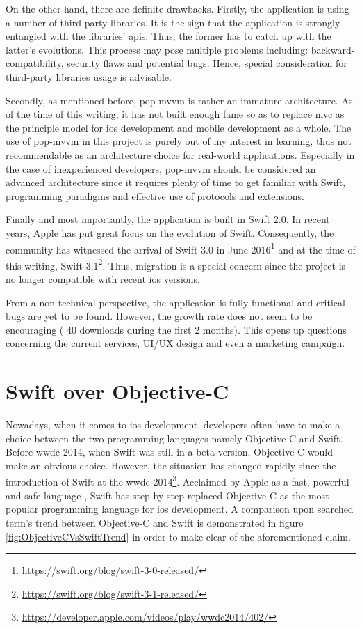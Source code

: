 \documentclass[11pt,a4paper,oneside,article]{memoir}
\begin{document}
On the other hand, there are definite drawbacks. Firstly, the application is using a number of third-party libraries. It is the sign that the application is strongly entangled with the libraries' \glspl{api}. Thus, the former has to catch up with the latter's evolutions. This process may pose multiple problems including: backward-compatibility, security flaws and potential bugs. Hence, special consideration for third-party libraries usage is advisable.\cite{libraries:usage}

Secondly, as mentioned before, \gls{pop-mvvm} is rather an immature architecture. As of the time of this writing, it has not built enough fame so as to replace \gls{mvc} as the principle model for \gls{ios} development and mobile development as a whole. The use of \gls{pop-mvvm} in this project is purely out of my interest in learning, thus not recommendable as an architecture choice for real-world applications. Especially in the case of inexperienced developers, \gls{pop-mvvm} should be considered  an advanced architecture since it requires plenty of time to get familiar with Swift, programming paradigms and effective use of protocols and extensions.

Finally and most importantly, the application is built in Swift 2.0. In recent years, Apple has put great focus on the evolution of Swift. Consequently, the community has witnessed the arrival of Swift 3.0 in June  2016\footnote{\url{https://swift.org/blog/swift-3-0-released/}} and at the time of this writing, Swift 3.1\footnote{\url{https://swift.org/blog/swift-3-1-released/}}. Thus, migration is a special concern since the project is no longer compatible with recent \gls{ios} versions.

From a non-technical perspective, the application is fully functional and critical bugs are yet to be found. However, the growth rate does not seem to be encouraging ( 40 downloads during the first 2 months). This opens up questions concerning the current services, UI/UX design and even a marketing campaign.

\section{Swift over Objective-C} \label{discussion:swift}
Nowadays, when it comes to \gls{ios} development, developers often have to make a choice between the two programming languages namely Objective-C and Swift. Before \gls{wwdc} 2014, when Swift was still in a beta version, Objective-C would make an obvious choice. However, the situation has changed rapidly since the introduction of Swift at the \gls{wwdc} 2014\footnote{\url{https://developer.apple.com/videos/play/wwdc2014/402/}}. Acclaimed by Apple as a fast, powerful and safe language \cite{apple:swift} , Swift has step by step replaced Objective-C as the most popular programming language for \gls{ios} development. A comparison upon searched term's trend between Objective-C and Swift is demonstrated in figure \ref{fig:ObjectiveCVsSwiftTrend} in order to make clear of the aforementioned claim.
\end{document}
